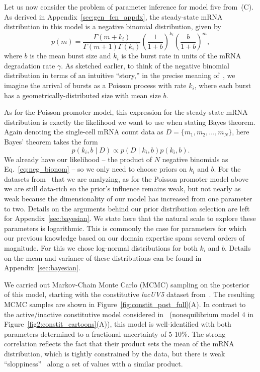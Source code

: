 Let us now consider the problem of parameter inference for model five
from~(C). As derived in
Appendix~\ref{sec:gen_fcn_appdx}, the steady-state mRNA distribution in this
model is a negative binomial distribution, given by
\begin{equation}
p(m) = \frac{\Gamma(m+k_i)}{\Gamma(m+1)\Gamma(k_i)}
        \left(\frac{1}{1+b}\right)^{k_i}
        \left(\frac{b}{1+b}\right)^m,
\label{eq:neg_bionom}
\end{equation}
where $b$ is the mean burst size and $k_i$ is the burst rate in units of the
mRNA degradation rate $\gamma$. As sketched earlier, to think of the negative
binomial distribution in terms of an intuitive ``story,'' in the precise
meaning of~\cite{Blitzstein2015}, we imagine the arrival of
bursts as a Poisson process with rate $k_i$, where each burst has a
geometrically-distributed size with mean size $b$.

As for the Poisson promoter model, this expression for the steady-state mRNA
distribution is exactly the likelihood we want to use when stating Bayes
theorem. Again denoting the single-cell mRNA count data as $D=\{m_1, m_2,\dots,
m_N\}$, here Bayes' theorem takes the form
\begin{equation}
p(k_i, b \mid D) \propto p(D\mid k_i,b)p(k_i, b).
\end{equation}
We already have our likelihood -- the product of $N$ negative binomials as
Eq.~\ref{eq:neg_bionom} -- so we only need to choose priors on $k_i$ and $b$.
For the datasets from~\cite{Jones2014} that we are analyzing, as for the Poisson
promoter model above we are still data-rich so the prior's influence remains
weak, but not nearly as weak because the dimensionality of our model has
increased from one parameter to two. Details on the arguments behind our prior
distribution selection are left for Appendix~\ref{sec:bayesian}. We state here
that the natural scale to explore these parameters is logarithmic. This is
commonly the case for parameters for which our previous knowledge based on our
domain expertise spans several orders of magnitude. For this we chose log-normal
distributions for both $k_i$ and $b$. Details on the mean and variance of these
distributions can be found in Appendix~\ref{sec:bayesian}.

We carried out Markov-Chain Monte Carlo (MCMC) sampling on the posterior of this
model, starting with the constitutive \textit{lacUV5} dataset
from~\cite{Jones2014}. The resulting MCMC samples are shown in
Figure~\ref{fig:constit_post_full}(A). In contrast to the active/inactive
constitutive model considered in~\cite{Razo-Mejia2020} (nonequilibrium model 4
in Figure~\ref{fig2:constit_cartoons}(A)), this model is well-identified with both
parameters determined to a fractional uncertainty of 5-10\%. The strong
correlation reflects the fact that their product sets the mean of the mRNA
distribution, which is tightly constrained by the data, but there is weak
``sloppiness''~\cite{Transtrum2015} along a set of values with a similar
product.

